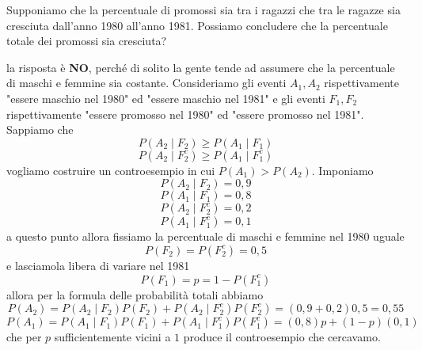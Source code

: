 \documentclass[11pt]{scrartcl}
\begin{document}
	\begin{example}
		Supponiamo che la percentuale di promossi sia tra i ragazzi che tra le ragazze sia cresciuta dall'anno 1980 all'anno 1981. Possiamo concludere che la percentuale totale dei promossi sia cresciuta?
	\end{example}
	la risposta è \textbf{NO}, perché di solito la gente tende ad assumere che la percentuale di maschi e femmine sia costante. Consideriamo gli eventi $A_1,A_2$ rispettivamente "essere maschio nel 1980" ed "essere maschio nel 1981" e gli eventi $F_1,F_2$ rispettivamente "essere promosso nel 1980" ed "essere promosso nel 1981". Sappiamo che 
	$$P(A_2\mid F_2)\ge P(A_1\mid F_1)$$
	$$P(A_2\mid F_2^c) \ge P(A_1 \mid F_1^c)$$
	vogliamo costruire un controesempio in cui $P(A_1)> P(A_2)$. Imponiamo 
	$$P(A_2\mid F_2)=0,9$$
	$$P(A_1\mid F_1)=0,8$$
	$$P(A_2\mid F_2^c)=0,2$$
	$$P(A_1 \mid F_1^c)=0,1$$
	a questo punto allora fissiamo la percentuale di maschi e femmine nel 1980 uguale
	$$P(F_2)=P(F_2^c)=0,5$$
	e lasciamola libera di variare nel 1981
	$$P(F_1)=p=1-P(F_1^c)$$
	allora per la formula delle probabilità totali abbiamo
	$$P(A_2)=P(A_2\mid F_2)P(F_2)+P(A_2\mid F_2^c)P(F_2^c)=(0,9+0,2)0,5=0,55$$
	$$P(A_1)=P(A_1 \mid F_1)P(F_1)+P(A_1\mid F_1^c)P(F_1^c)=(0,8)p+(1-p)(0,1)$$
	che per $p$ sufficientemente vicini a $1$ produce il controesempio che cercavamo.
\end{document}
